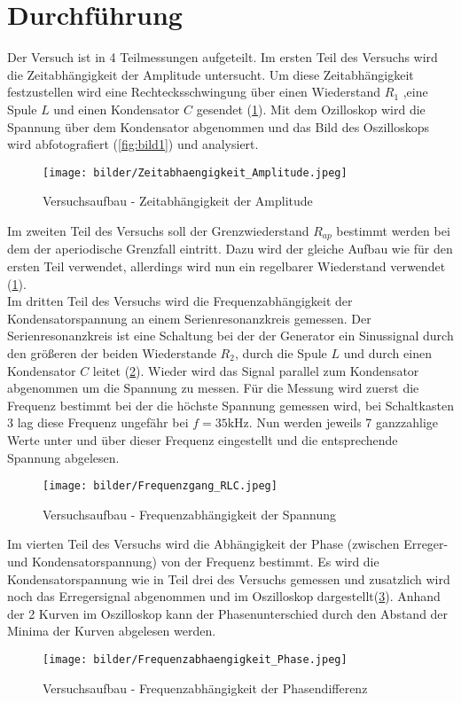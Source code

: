 \newpage
\section{Durchführung}
\label{sec:Durchfuehrung}
Der Versuch ist in 4 Teilmessungen aufgeteilt.
Im ersten Teil des Versuchs wird die Zeitabhängigkeit der Amplitude untersucht.
Um diese Zeitabhängigkeit festzustellen wird eine Rechtecksschwingung über einen Wiederstand $R_1$ ,eine Spule $L$ und einen Kondensator $C$ gesendet (\ref{fig:Aufbau1}).
Mit dem Ozilloskop wird die Spannung über dem Kondensator abgenommen und das Bild des Oszilloskops wird abfotografiert (\ref{fig:bild1}) und analysiert.
\begin{figure}
    \centering
    \texttt{[image: bilder/Zeitabhaengigkeit\_Amplitude.jpeg]}
    \caption{Versuchsaufbau - Zeitabhängigkeit der Amplitude}
    \label{fig:Aufbau1}
\end{figure}

Im zweiten Teil des Versuchs soll der Grenzwiederstand $R_{ap}$ bestimmt werden bei dem der aperiodische Grenzfall eintritt.
Dazu wird der gleiche Aufbau wie für den ersten Teil verwendet, allerdings wird nun ein regelbarer Wiederstand verwendet (\ref{fig:Aufbau1}).\\

Im dritten Teil des Versuchs wird die Frequenzabhängigkeit der Kondensatorspannung an einem Serienresonanzkreis gemessen.
Der Serienresonanzkreis ist eine Schaltung bei der  der Generator ein Sinussignal durch den größeren der beiden Wiederstande $R_2$, durch die Spule $L$ und durch einen Kondensator $C$ leitet (\ref{fig:Aufbau2}).
Wieder wird das Signal parallel zum Kondensator abgenommen um die Spannung zu messen.
Für die Messung wird zuerst die Frequenz bestimmt bei der die höchste Spannung gemessen wird, bei Schaltkasten 3 lag diese Frequenz ungefähr bei $f = 35 \text{kHz}$.
Nun werden jeweils 7 ganzzahlige Werte unter und über dieser Frequenz eingestellt und die entsprechende Spannung abgelesen.
\begin{figure}
    \centering
    \texttt{[image: bilder/Frequenzgang\_RLC.jpeg]}
    \caption{Versuchsaufbau - Frequenzabhängigkeit der Spannung}
    \label{fig:Aufbau2}
\end{figure}

Im vierten Teil des Versuchs wird die Abhängigkeit der Phase (zwischen Erreger- und Kondensatorspannung) von der Frequenz bestimmt.
Es wird die Kondensatorspannung wie in Teil drei des Versuchs gemessen und zusatzlich wird noch das Erregersignal abgenommen und im Oszilloskop dargestellt(\ref{fig:Aufbau3}).
Anhand der 2 Kurven im Oszilloskop kann der Phasenunterschied durch den Abstand der Minima der Kurven abgelesen werden.

\begin{figure}
    \centering
    \texttt{[image: bilder/Frequenzabhaengigkeit\_Phase.jpeg]}
    \caption{Versuchsaufbau - Frequenzabhängigkeit der Phasendifferenz}
    \label{fig:Aufbau3}
\end{figure}